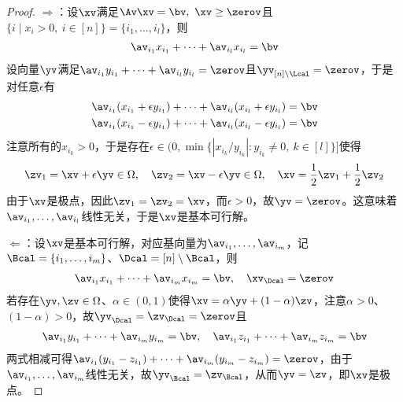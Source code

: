 \documentclass{ctexart}
\begin{document}
\begin{proof}
    $\Rightarrow$：设$\xv$满足$\Av \xv = \bv, ~ \xv \ge \zerov$且$\{ i \mid x_i > 0, ~ i \in [n] \} = \{ i_1, \ldots, i_l \}$，则
    \begin{align*}
        \av_{i_1} x_{i_1} + \cdots + \av_{i_l} x_{i_l} = \bv
    \end{align*}
    设向量$\yv$满足$\av_{i_1} y_{i_1} + \cdots + \av_{i_l} y_{i_l} = \zerov$且$\yv_{[n]\setminus \Lcal} = \zerov$，于是对任意$\epsilon$有
    \begin{align*}
        \av_{i_1} (x_{i_1} + \epsilon y_{i_1}) + \cdots + \av_{i_l} (x_{i_l} + \epsilon y_{i_l}) & = \bv \\
        \av_{i_1} (x_{i_1} - \epsilon y_{i_1}) + \cdots + \av_{i_l} (x_{i_l} - \epsilon y_{i_l}) & = \bv
    \end{align*}
    注意所有的$x_{i_k}>0$，于是存在$\epsilon \in (0, \min\{ | x_{i_k} / y_{i_k} | : y_{i_k} \ne 0, ~ k \in [l] \}]$使得
    \begin{align*}
        \zv_1 = \xv + \epsilon \yv \in \Omega, \quad \zv_2 = \xv - \epsilon \yv \in \Omega, \quad \xv = \frac{1}{2} \zv_1 + \frac{1}{2} \zv_2
    \end{align*}
    由于$\xv$是极点，因此$\zv_1 = \zv_2 = \xv$，而$\epsilon > 0$，故$\yv = \zerov$。这意味着$\av_{i_1}, \ldots, \av_{i_l}$线性无关，于是$\xv$是基本可行解。

    $\Leftarrow$：设$\xv$是基本可行解，对应基向量为$\av_{i_1}, \ldots, \av_{i_m}$，记$\Bcal = \{i_1, \ldots, i_m\}$、$\Dcal = [n] \setminus \Bcal$，则
    \begin{align*}
        \av_{i_1} x_{i_1} + \cdots + \av_{i_m} x_{i_m} = \bv, \quad \xv_\Dcal = \zerov
    \end{align*}
    若存在$\yv, \zv \in \Omega$、$\alpha \in (0,1)$使得$\xv = \alpha \yv + (1 - \alpha)\zv$，注意$\alpha > 0$、$(1- \alpha) > 0$，故$\yv_\Dcal = \zv_\Dcal = \zerov$且
    \begin{align*}
        \av_{i_1} y_{i_1} + \cdots + \av_{i_m} y_{i_m} = \bv, \quad \av_{i_1} z_{i_1} + \cdots + \av_{i_m} z_{i_m} = \bv
    \end{align*}
    两式相减可得$\av_{i_1} (y_{i_1} - z_{i_1}) + \cdots + \av_{i_m} (y_{i_m} - z_{i_m}) = \zerov$，由于$\av_{i_1}, \ldots, \av_{i_m}$线性无关，故$\yv_\Bcal = \zv_\Bcal$，从而$\yv = \zv$，即$\xv$是极点。
\end{proof}
\end{document}
